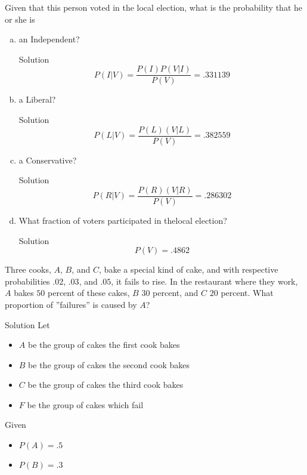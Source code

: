 \documentclass{article}
\begin{document}
\begin{spacing}{1.1}
\begin{homeworkProblem}
  Given that this person voted in the local election, what is the 
  probability that he or she is
  \begin{enumerate}[(a)]
    \item an Independent?
      \begin{homeworkSection}{Solution}
         \[P( I|V) = \frac{ P( I) P( V|I)}{ P(V)} = .331139\]
      \end{homeworkSection}
    \item a Liberal?
      \begin{homeworkSection}{Solution}
         \[P( L|V) = \frac{ P( L)( V|L)}{ P(V)} = .382559\]
      \end{homeworkSection}
    \item a Conservative?
      \begin{homeworkSection}{Solution}
         \[P( R|V) = \frac{ P( R)( V|R)}{ P(V)} = .286302\]
      \end{homeworkSection}
    \item What fraction of voters participated in thelocal election?
      \begin{homeworkSection}{Solution}
         \[P( V) = .4862\]
      \end{homeworkSection}
  \end{enumerate}
\end{homeworkProblem}
\newpage
\begin{homeworkProblem}
  Three cooks, $A$, $B$, and $C$, bake a special kind of cake, and with 
  respective probabilities $.02$, $.03$, and $.05$, it fails to rise. 
  In the restaurant where they work, $A$ bakes $50$ percent of these cakes, 
  $B$ $30$ percent, and $C$ $20$ percent. What proportion of ''failures'' 
  is caused by $A$?
  \begin{homeworkSection}{Solution}
     Let
    \begin{itemize}
      \item $A$ be the group of cakes the first cook bakes
      \item $B$ be the group of cakes the second cook bakes
      \item $C$ be the group of cakes the third cook bakes
      \item $F$ be the group of cakes which fail
    \end{itemize}
    Given
    \begin{itemize}
      \item $P( A) = .5$
      \item $P( B) = .3$

\end{itemize}
\end{homeworkSection}
\end{homeworkProblem}
\end{spacing}
\end{document}
